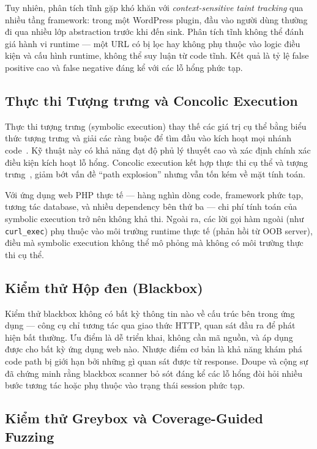 Tuy nhiên, phân tích tĩnh gặp khó khăn với \textit{context-sensitive taint tracking}
qua nhiều tầng framework: trong một WordPress plugin, đầu vào người dùng thường đi
qua nhiều lớp abstraction trước khi đến sink. Phân tích tĩnh không thể đánh giá hành
vi runtime --- một URL có bị lọc hay không phụ thuộc vào logic điều kiện và cấu hình
runtime, không thể suy luận từ code tĩnh. Kết quả là tỷ lệ false positive cao và
false negative đáng kể với các lỗ hổng phức tạp.

\subsection{Thực thi Tượng trưng và Concolic Execution}

Thực thi tượng trưng (symbolic execution) thay thế các giá trị cụ thể bằng biểu thức
tượng trưng và giải các ràng buộc để tìm đầu vào kích hoạt mọi nhánh
code~\cite{godefroid2008automated}. Kỹ thuật này có khả năng đạt độ phủ lý thuyết
cao và xác định chính xác điều kiện kích hoạt lỗ hổng. Concolic execution kết hợp
thực thi cụ thể và tượng trưng~\cite{ganesh2009taint}, giảm bớt vấn đề ``path
explosion'' nhưng vẫn tốn kém về mặt tính toán.

Với ứng dụng web PHP thực tế --- hàng nghìn dòng code, framework phức tạp, tương tác
database, và nhiều dependency bên thứ ba --- chi phí tính toán của symbolic execution
trở nên không khả thi. Ngoài ra, các lời gọi hàm ngoài (như \texttt{curl\_exec})
phụ thuộc vào môi trường runtime thực tế (phản hồi từ OOB server), điều mà symbolic
execution không thể mô phỏng mà không có môi trường thực thi cụ thể.

\subsection{Kiểm thử Hộp đen (Blackbox)}

Kiểm thử blackbox không có bất kỳ thông tin nào về cấu trúc bên trong ứng dụng ---
công cụ chỉ tương tác qua giao thức HTTP, quan sát đầu ra để phát hiện bất thường.
Ưu điểm là dễ triển khai, không cần mã nguồn, và áp dụng được cho bất kỳ ứng dụng
web nào. Nhược điểm cơ bản là khả năng khám phá code path bị giới hạn bởi những gì
quan sát được từ response. Doupe và cộng sự~\cite{doupe2010johnny} đã chứng minh
rằng blackbox scanner bỏ sót đáng kể các lỗ hổng đòi hỏi nhiều bước tương tác hoặc
phụ thuộc vào trạng thái session phức tạp.

\subsection{Kiểm thử Greybox và Coverage-Guided Fuzzing}

